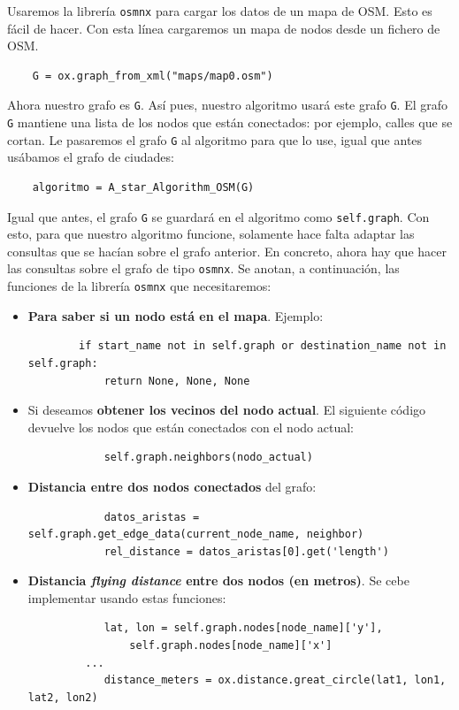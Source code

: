\documentclass{article}
\begin{document}
Usaremos la librería \texttt{osmnx} para cargar los datos de un mapa de OSM. Esto es fácil de hacer. Con esta línea cargaremos un mapa de nodos desde un fichero de OSM.
\begin{verbatim}
    G = ox.graph_from_xml("maps/map0.osm")
\end{verbatim}
Ahora nuestro grafo es \texttt{G}. Así pues, nuestro algoritmo usará este grafo \texttt{G}. El grafo \texttt{G} mantiene una lista de los nodos que están conectados: por ejemplo, calles que se cortan. Le pasaremos el grafo \texttt{G} al algoritmo para que lo use, igual que antes usábamos el grafo de ciudades:
\begin{verbatim}
    algoritmo = A_star_Algorithm_OSM(G)
\end{verbatim}
Igual que antes,  el grafo \texttt{G} se guardará en el algoritmo como \texttt{self.graph}. Con esto, para que nuestro algoritmo funcione, solamente hace falta adaptar las consultas que se hacían sobre el grafo anterior. En concreto, ahora hay que hacer las consultas sobre el grafo de tipo \texttt{osmnx}. Se anotan, a continuación, las funciones de la librería \texttt{osmnx} que necesitaremos: 
\begin{itemize}
    \item \textbf{Para saber si un nodo está en el mapa}. Ejemplo:
    \begin{verbatim}
        if start_name not in self.graph or destination_name not in self.graph:
            return None, None, None    
    \end{verbatim}
    \item Si deseamos \textbf{obtener los vecinos del nodo actual}. El siguiente código devuelve los nodos que están conectados con el nodo actual:
        \begin{verbatim}
            self.graph.neighbors(nodo_actual)
        \end{verbatim}
    \item \textbf{Distancia entre dos nodos conectados} del grafo:
        \begin{verbatim}
            datos_aristas = self.graph.get_edge_data(current_node_name, neighbor)
            rel_distance = datos_aristas[0].get('length')
        \end{verbatim}
    
    \item \textbf{Distancia \textit{flying distance} entre dos nodos (en metros)}. Se cebe implementar usando estas funciones:
        \begin{verbatim}
            lat, lon = self.graph.nodes[node_name]['y'], 
                self.graph.nodes[node_name]['x']
         ... 
            distance_meters = ox.distance.great_circle(lat1, lon1, lat2, lon2)
        \end{verbatim}    
\end{itemize}
\end{document}
